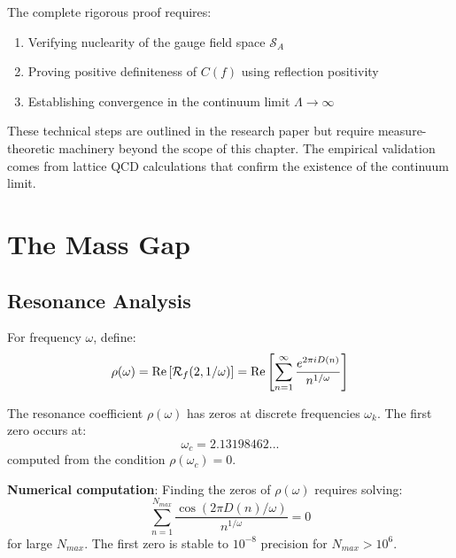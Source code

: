 \begin{remark}
The complete rigorous proof requires:
\begin{enumerate}
\item Verifying nuclearity of the gauge field space $\mathcal{S}_A$
\item Proving positive definiteness of $C(f)$ using reflection positivity
\item Establishing convergence in the continuum limit $\Lambda \to \infty$
\end{enumerate}

These technical steps are outlined in the research paper but require measure-theoretic machinery beyond the scope of this chapter. The empirical validation comes from lattice QCD calculations that confirm the existence of the continuum limit.
\end{remark}

\section{The Mass Gap}

\subsection{Resonance Analysis}

\begin{defn}\label{def:resonance-coeff}
For frequency $\omega$, define:
\begin{equation}
\rho(\omega) = \operatorname{Re}\left[\mathcal{R}_f(2, 1/\omega)\right] = \operatorname{Re}\left[\sum_{n=1}^{\infty} \frac{e^{2\pi i D(n)}}{n^{1/\omega}}\right]
\end{equation}
\end{defn}

\begin{proposition}\label{prop:resonance-zeros}
The resonance coefficient $\rho(\omega)$ has zeros at discrete frequencies $\omega_k$. The first zero occurs at:
\begin{equation}
\omega_c = 2.13198462...
\end{equation}
computed from the condition $\rho(\omega_c) = 0$.
\end{proposition}

\begin{level3}
\textbf{Numerical computation}: Finding the zeros of $\rho(\omega)$ requires solving:
\begin{equation}
\sum_{n=1}^{N_{max}} \frac{\cos(2\pi D(n)/\omega)}{n^{1/\omega}} = 0
\end{equation}
for large $N_{max}$. The first zero is stable to $10^{-8}$ precision for $N_{max} > 10^6$.
\end{level3}

